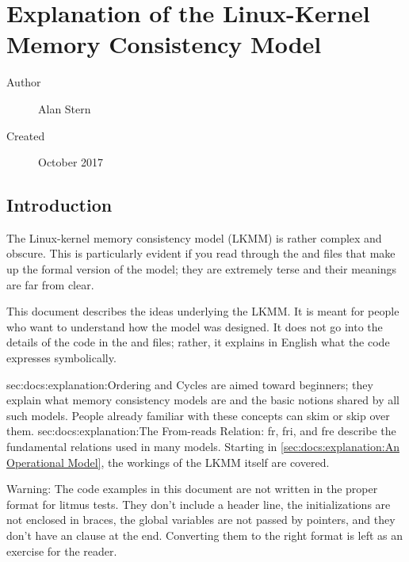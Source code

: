 \chapter{Explanation of the Linux-Kernel Memory Consistency Model}

\begin{Note}
\begin{description}
\item[Author] Alan Stern 
\item[Created] October 2017
\end{description}
\end{Note}

\section{Introduction}

The Linux-kernel memory consistency model (LKMM) is rather complex and
obscure.
This is particularly evident if you read through the
 and  files that
make up the formal version of the model; they are extremely terse and
their meanings are far from clear.

This document describes the ideas underlying the LKMM\@.
It is meant for people who want to understand how the model was designed.
It does not go into the details of the code in the  and
 files; rather, it explains in English what the code
expresses symbolically.

%
  {sec:docs:explanation:Ordering and Cycles} are aimed
toward beginners; they explain what memory consistency models are and
the basic notions shared by all such models.
People already familiar with these concepts can skim or skip over them.
%
 {sec:docs:explanation:The From-reads Relation: fr, fri, and fre}
describe the fundamental relations used in many models.
Starting in \cref{sec:docs:explanation:An Operational Model},
the workings of the LKMM itself are covered.

\begin{Warn}
  Warning:
  The code examples in this document are not written in the proper format
  for litmus tests.
  They don't include a header line, the initializations are not enclosed
  in braces, the global variables are not passed by pointers, and they
  don't have an  clause at the end.
  Converting them to the right format is left as an exercise for the reader.
\end{Warn}

